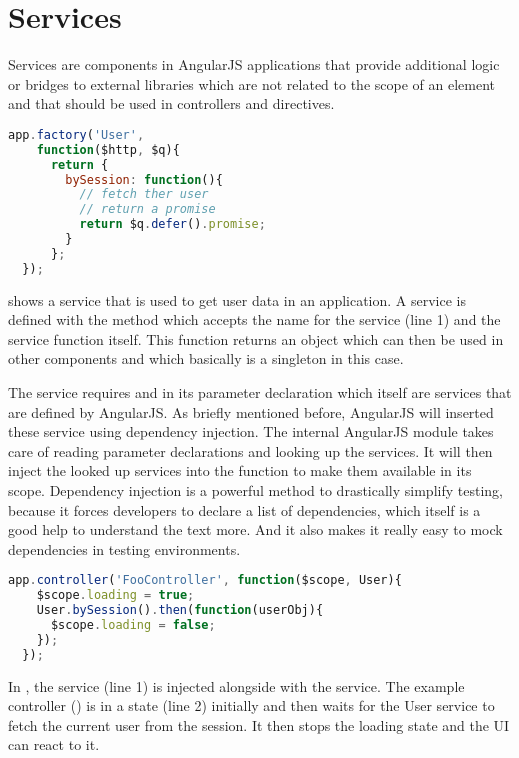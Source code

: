 \section{Services}
\label{sect:services}

Services are components in AngularJS applications that provide additional logic or bridges to external libraries which are not related to the scope of an element and that should be used in controllers and directives.

\begin{lstlisting}[language=JavaScript, caption=A simple AngularJS service, label=lst:angular-service]
  app.factory('User',
    function($http, $q){
      return {
        bySession: function(){
          // fetch ther user
          // return a promise
          return $q.defer().promise;
        }
      };
  });
\end{lstlisting}

 shows a  service that is used to get user data in an application. A service is defined with the  method which accepts the name for the service (line 1) and the service function itself. This function returns an object which can then be used in other components and which basically is a singleton in this case. 

The service requires  and  in its parameter declaration which itself are services that are defined by AngularJS. As briefly mentioned before, AngularJS will inserted these service using dependency injection. The internal AngularJS module  takes care of reading parameter declarations and looking up the services. It will then inject the looked up services into the function to make them available in its scope. Dependency injection is a powerful method to drastically simplify testing, because it forces developers to declare a list of dependencies, which itself is a good help to understand the text more. And it also makes it really easy to mock dependencies in testing environments.

\begin{lstlisting}[language=JavaScript, caption=Using a custom service, label=lst:angular-service-example]
  app.controller('FooController', function($scope, User){
    $scope.loading = true;
    User.bySession().then(function(userObj){
      $scope.loading = false;
    });
  });
\end{lstlisting}

In , the  service (line 1) is injected alongside with the  service. The example controller () is in a  state (line 2) initially and then waits for the User service to fetch the current user from the session. It then stops the loading state and the UI can react to it.